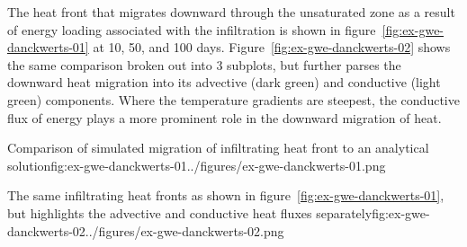 The heat front that migrates downward through the unsaturated zone as a result of energy loading associated with the infiltration is shown in figure~\ref{fig:ex-gwe-danckwerts-01} at 10, 50, and 100 days.  Figure~\ref{fig:ex-gwe-danckwerts-02} shows the same comparison broken out into 3 subplots, but further parses the downward heat migration into its advective (dark green) and conductive (light green) components.  Where the temperature gradients are steepest, the conductive flux of energy plays a more prominent role in the downward migration of heat.

\begin{StandardFigure}{
   Comparison of simulated migration of infiltrating heat front to an analytical solution}{fig:ex-gwe-danckwerts-01}{../figures/ex-gwe-danckwerts-01.png}
\end{StandardFigure}

\begin{StandardFigure}{
   The same infiltrating heat fronts as shown in figure~\ref{fig:ex-gwe-danckwerts-01}, but highlights the advective and conductive heat fluxes separately}{fig:ex-gwe-danckwerts-02}{../figures/ex-gwe-danckwerts-02.png}
\end{StandardFigure}
